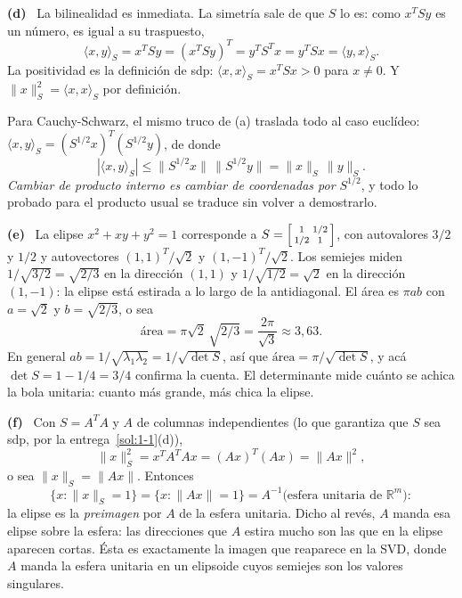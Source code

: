 \documentclass[11pt,a4paper]{article}
\newcommand{\R}{\mathbb{R}}
\newcounter{entrega}[section]
\newcommand{\itemsol}[1]{\par\medskip\noindent\textbf{(#1)}\ \ignorespaces}
\begin{document}
\itemsol{d} La bilinealidad es inmediata. La simetría sale de que $S$ lo es: como
$x^TSy$ es un número, es igual a su traspuesto,
\[
\langle x,y\rangle_S=x^TSy=(x^TSy)^T=y^TS^Tx=y^TSx=\langle y,x\rangle_S .
\]
La positividad es la definición de sdp: $\langle x,x\rangle_S=x^TSx>0$ para
$x\neq0$. Y $\|x\|_S^2=\langle x,x\rangle_S$ por definición.

Para Cauchy-Schwarz, el mismo truco de (a) traslada todo al caso euclídeo:
$\langle x,y\rangle_S=(S^{1/2}x)^T(S^{1/2}y)$, de donde
\[
|\langle x,y\rangle_S|\le\|S^{1/2}x\|\,\|S^{1/2}y\|=\|x\|_S\,\|y\|_S .
\]
\emph{Cambiar de producto interno es cambiar de coordenadas por $S^{1/2}$}, y
todo lo probado para el producto usual se traduce sin volver a demostrarlo.

\itemsol{e} La elipse $x^2+xy+y^2=1$ corresponde a
$S=\begin{bsmallmatrix}1&1/2\\1/2&1\end{bsmallmatrix}$, con autovalores $3/2$ y
$1/2$ y autovectores $(1,1)^T/\sqrt2$ y $(1,-1)^T/\sqrt2$. Los semiejes miden
$1/\sqrt{3/2}=\sqrt{2/3}$ en la dirección $(1,1)$ y $1/\sqrt{1/2}=\sqrt2$ en la
dirección $(1,-1)$: la elipse está estirada a lo largo de la antidiagonal. El
área es $\pi ab$ con $a=\sqrt2$ y $b=\sqrt{2/3}$, o sea
\[
\text{área}=\pi\sqrt2\,\sqrt{2/3}=\frac{2\pi}{\sqrt3}\approx3{,}63 .
\]
En general $ab=1/\sqrt{\lambda_1\lambda_2}=1/\sqrt{\det S}$, así que
$\text{área}=\pi/\sqrt{\det S}$, y acá $\det S=1-1/4=3/4$ confirma la cuenta. El
determinante mide cuánto se achica la bola unitaria: cuanto más grande, más chica
la elipse.

\itemsol{f} Con $S=A^TA$ y $A$ de columnas independientes (lo que garantiza que
$S$ sea sdp, por la entrega~\ref{sol:1-1}(d)),
\[
\|x\|_S^{2}=x^TA^TAx=(Ax)^T(Ax)=\|Ax\|^{2},
\]
o sea $\|x\|_S=\|Ax\|$. Entonces
\[
\{x:\|x\|_S=1\}=\{x:\|Ax\|=1\}
=A^{-1}\big(\text{esfera unitaria de }\R^{m}\big):
\]
la elipse es la \emph{preimagen} por $A$ de la esfera unitaria. Dicho al revés,
$A$ manda esa elipse sobre la esfera: las direcciones que $A$ estira mucho son
las que en la elipse aparecen cortas. Ésta es exactamente la imagen que reaparece
en la SVD, donde $A$ manda la esfera unitaria en un elipsoide cuyos semiejes son
los valores singulares.
\end{document}
